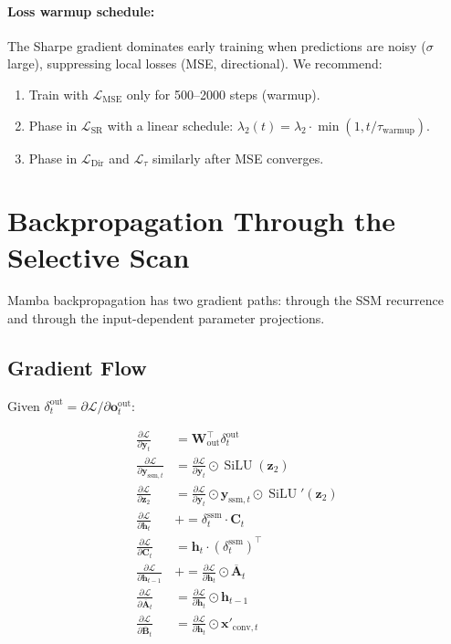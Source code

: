 \documentclass[11pt,a4paper]{article}
\newcommand{\SiLU}{\operatorname{SiLU}}
\newcommand{\loss}{\mathcal{L}}
\begin{document}
\paragraph{Loss warmup schedule:} The Sharpe gradient dominates early training
when predictions are noisy ($\sigma$ large), suppressing local losses (MSE,
directional). We recommend:
\begin{enumerate}
  \item Train with $\loss_{\text{MSE}}$ only for 500--2000 steps (warmup).
  \item Phase in $\loss_{\text{SR}}$ with a linear schedule:
    $\lambda_2(t) = \lambda_2 \cdot \min(1, t / \tau_{\text{warmup}})$.
  \item Phase in $\loss_{\text{Dir}}$ and $\loss_\tau$ similarly after MSE
    converges.
\end{enumerate}

\section{Backpropagation Through the Selective Scan}

Mamba backpropagation has two gradient paths: through the SSM recurrence and
through the input-dependent parameter projections.

\subsection{Gradient Flow}

Given $\delta_t^{\text{out}} = \partial\loss / \partial \mathbf{o}_t^{\text{out}}$:

\begin{align}
  \frac{\partial\loss}{\partial \mathbf{y}_t} &= \mathbf{W}_{\text{out}}^\top \delta_t^{\text{out}} \\
  \frac{\partial\loss}{\partial \mathbf{y}_{\text{ssm},t}} &= \frac{\partial\loss}{\partial \mathbf{y}_t} \odot \SiLU(\mathbf{z}_2) \\
  \frac{\partial\loss}{\partial \mathbf{z}_2} &= \frac{\partial\loss}{\partial \mathbf{y}_t} \odot \mathbf{y}_{\text{ssm},t} \odot \SiLU'(\mathbf{z}_2) \\
  \frac{\partial\loss}{\partial \mathbf{h}_t} &\mathrel{+}= \delta_t^{\text{ssm}} \cdot \mathbf{C}_t \\
  \frac{\partial\loss}{\partial \mathbf{C}_t} &= \mathbf{h}_t \cdot (\delta_t^{\text{ssm}})^\top \\
  \frac{\partial\loss}{\partial \mathbf{h}_{t-1}} &\mathrel{+}= \frac{\partial\loss}{\partial \mathbf{h}_t} \odot \overline{\mathbf{A}}_t \\
  \frac{\partial\loss}{\partial \overline{\mathbf{A}}_t} &= \frac{\partial\loss}{\partial \mathbf{h}_t} \odot \mathbf{h}_{t-1} \\
  \frac{\partial\loss}{\partial \overline{\mathbf{B}}_t} &= \frac{\partial\loss}{\partial \mathbf{h}_t} \odot \mathbf{x}'_{\text{conv},t}
\end{align}
\end{document}

